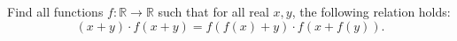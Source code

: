 Find all functions $f:\mathbb{R} \to \mathbb{R}$ such that for all real $x, y$,  the following relation holds: $$(x+y) \cdot f(x+y)= f(f(x)+y) \cdot f(x+f(y)).$$